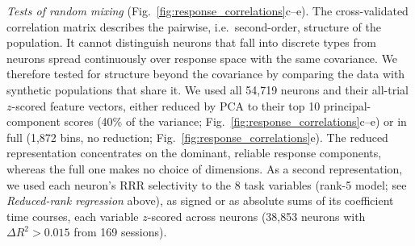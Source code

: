\documentclass[10pt,lineno]{elife}
\begin{document}
\textit{Tests of random mixing} (Fig.~\ref{fig:response_correlations}c--e). The cross-validated correlation matrix describes the pairwise, i.e.\ second-order, structure of the population. It cannot distinguish neurons that fall into discrete types from neurons spread continuously over response space with the same covariance. We therefore tested for structure beyond the covariance by comparing the data with synthetic populations that share it. We used all 54,719 neurons and their all-trial $z$-scored feature vectors, either reduced by PCA to their top 10 principal-component scores (40\% of the variance; Fig.~\ref{fig:response_correlations}c--e) or in full (1,872 bins, no reduction; Fig.~\ref{fig:response_correlations}e). The reduced representation concentrates on the dominant, reliable response components, whereas the full one makes no choice of dimensions. As a second representation, we used each neuron's RRR selectivity to the 8 task variables (rank-5 model; see \textit{Reduced-rank regression} above), as signed or as absolute sums of its coefficient time courses, each variable $z$-scored across neurons (38,853 neurons with $\Delta R^2>0.015$ from 169 sessions).
\end{document}
